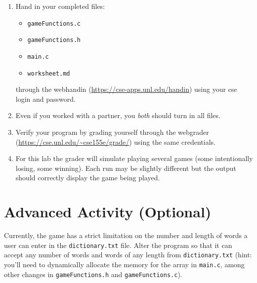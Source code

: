 \documentclass[12pt]{scrartcl}
\begin{document}
\begin{enumerate}
  \item Hand in your completed files:
  \begin{itemize}
    \item \texttt{gameFunctions.c}
    \item \texttt{gameFunctions.h}
    \item \texttt{main.c}
    \item \texttt{worksheet.md}
  \end{itemize}
  through the webhandin (\url{https://cse-apps.unl.edu/handin}) 
  using your cse login and password.  
  \item Even if you worked with a partner, you \emph{both} should
  turn in all files.
  \item Verify your program by grading yourself through the
  webgrader (\url{https://cse.unl.edu/~cse155e/grade/}) using the
  same credentials.
  \item For this lab the grader will simulate playing 
  several games (some intentionally losing, some winning).
  Each run may be slightly different but the output should
  correctly display the game being played.
\end{enumerate}

\section{Advanced Activity (Optional)}

Currently, the game has a strict limitation on the number and length of 
words a user can enter in the \texttt{dictionary.txt} file.  
Alter the program so that it can accept any number of words and words 
of any length from \texttt{dictionary.txt} (hint: you'll 
need to dynamically allocate the memory for the array in 
\texttt{main.c}, among other changes in 
\texttt{gameFunctions.h} and \texttt{gameFunctions.c}).  
\end{document}
